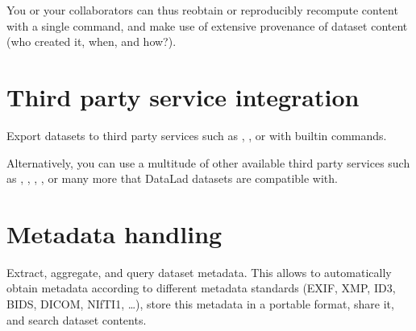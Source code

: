 \begin{figure}[tbp]
\centering

\noindent{}
\end{figure}

\sphinxAtStartPar
You or your collaborators can thus reobtain or reproducibly recompute content
with a single command, and make use of extensive provenance of dataset content
(who created it, when, and how?).


\section{Third party service integration}
\label{\detokenize{intro/executive_summary:third-party-service-integration}}
\sphinxAtStartPar
Export datasets to third party services such as
, , or
 with built\sphinxhyphen{}in commands.

\begin{figure}[tbp]
\centering

\noindent{}
\end{figure}

\sphinxAtStartPar
Alternatively, you can use a multitude of other available third party services such as
, ,
, ,
or many more that DataLad datasets are compatible with.


\section{Metadata handling}
\label{\detokenize{intro/executive_summary:metadata-handling}}
\sphinxAtStartPar
Extract, aggregate, and query dataset metadata. This allows to automatically obtain
metadata according to different metadata standards (EXIF, XMP, ID3, BIDS, DICOM,
NIfTI1, …), store this metadata in a portable format, share it, and search dataset
contents.

\begin{figure}[tbp]
\centering

\noindent{}
\end{figure}



